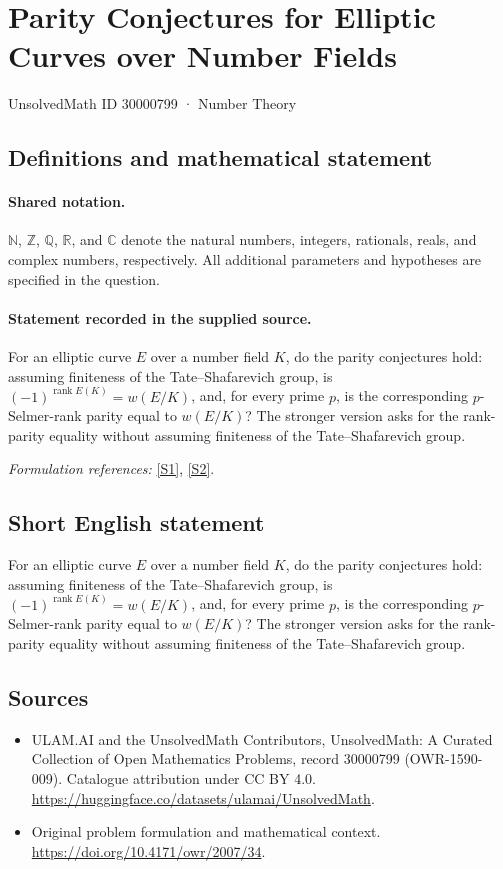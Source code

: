 \documentclass[11pt]{article}
\newcommand{\sref}[2]{\hyperlink{source:#1:#2}{[S#2]}}
\begin{document}
\setcounter{section}{30000798}
\section{Parity Conjectures for Elliptic Curves over Number Fields}\label{30000799}
{\small UnsolvedMath ID 30000799 · Number Theory}
\subsection{Definitions and mathematical statement}

\paragraph{Shared notation.}$\mathbb N$, $\mathbb Z$, $\mathbb Q$, $\mathbb R$, and $\mathbb C$ denote the natural numbers, integers, rationals, reals, and complex numbers, respectively. All additional parameters and hypotheses are specified in the question.


\paragraph{Statement recorded in the supplied source.}
For an elliptic curve $E$ over a number field $K$, do the parity conjectures hold: assuming finiteness of the Tate–Shafarevich group, is $(-1)^{\operatorname{rank}E(K)}=w(E/K)$, and, for every prime $p$, is the corresponding $p$-Selmer-rank parity equal to $w(E/K)$? The stronger version asks for the rank-parity equality without assuming finiteness of the Tate–Shafarevich group.
\par\smallskip\textit{Formulation references:} \sref{30000799}{1}, \sref{30000799}{2}.
\subsection{Short English statement}
For an elliptic curve $E$ over a number field $K$, do the parity conjectures hold: assuming finiteness of the Tate–Shafarevich group, is $(-1)^{\operatorname{rank}E(K)}=w(E/K)$, and, for every prime $p$, is the corresponding $p$-Selmer-rank parity equal to $w(E/K)$? The stronger version asks for the rank-parity equality without assuming finiteness of the Tate–Shafarevich group.
\subsection{Sources}
\begin{itemize}
\item[\hypertarget{source:30000799:1}{S1}] ULAM.AI and the UnsolvedMath Contributors, UnsolvedMath: A Curated Collection of Open Mathematics Problems, record 30000799 (OWR-1590-009). Catalogue attribution under CC BY 4.0.
\url{https://huggingface.co/datasets/ulamai/UnsolvedMath}.
\item[\hypertarget{source:30000799:2}{S2}] Original problem formulation and mathematical context.
\url{https://doi.org/10.4171/owr/2007/34}.
\end{itemize}
\label{end:30000799}
\end{document}
